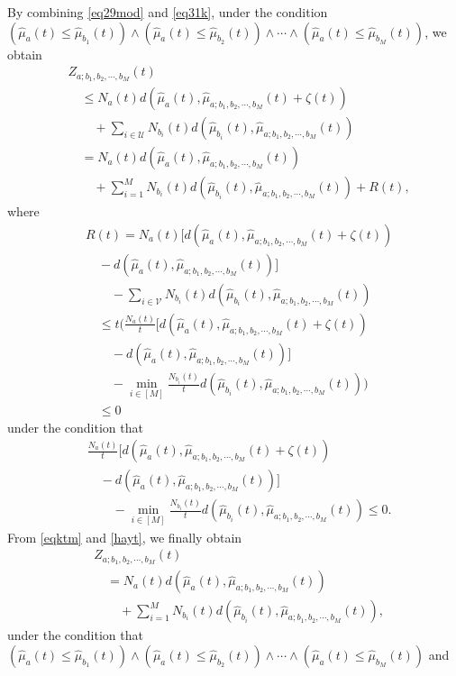 \documentclass[final]{IEEEtran}
\newcommand{\nn}{\nonumber}
\newcommand{\calU}{\mathcal{U}}
\newcommand{\calV}{\mathcal{V}}
\begin{document}
By combining \eqref{eq29mod} and \eqref{eq31k}, under the condition $(\hat{\mu}_a(t)\leq \hat{\mu}_{b_1}(t))\wedge (\hat{\mu}_a(t)\leq \hat{\mu}_{b_2}(t))\wedge \cdots \wedge (\hat{\mu}_a(t)\leq \hat{\mu}_{b_M}(t))$, we obtain
\begin{align}
&Z_{a;b_1,b_2,\cdots,b_M}(t) \nn\\
&\quad \leq N_a(t)d(\hat{\mu}_a(t),\hat{\mu}_{a;b_1,b_2,\cdots,b_M}(t)+\zeta(t))\nn\\
&\qquad +\sum_{i\in \calU} N_{b_i}(t) d(\hat{\mu}_{b_i}(t),\hat{\mu}_{a;b_1,b_2,\cdots,b_M}(t))\\
&\quad = N_a(t)d(\hat{\mu}_a(t),\hat{\mu}_{a;b_1,b_2,\cdots,b_M}(t))\nn\\
&\qquad +\sum_{i=1}^M N_{b_i}(t) d(\hat{\mu}_{b_i}(t),\hat{\mu}_{a;b_1,b_2,\cdots,b_M}(t))+ R(t),
\end{align}
where
\begin{align}
&R(t)=N_a(t)\big[d(\hat{\mu}_a(t),\hat{\mu}_{a;b_1,b_2,\cdots,b_M}(t)+\zeta(t))\nn\\
&\quad - d(\hat{\mu}_a(t),\hat{\mu}_{a;b_1,b_2,\cdots,b_M}(t))\big]\nn\\
&\qquad -\sum_{i \in \calV}  N_{b_i}(t) d(\hat{\mu}_{b_i}(t),\hat{\mu}_{a;b_1,b_2,\cdots,b_M}(t))\\
&\quad \leq t\bigg(\frac{N_a(t)}{t} \big[d(\hat{\mu}_a(t),\hat{\mu}_{a;b_1,b_2,\cdots,b_M}(t)+\zeta(t))\nn\\
&\qquad - d(\hat{\mu}_a(t),\hat{\mu}_{a;b_1,b_2,\cdots,b_M}(t))\big]\nn\\
&\qquad  -\min_{i \in [M]} \frac{N_{b_i}(t)}{t} d(\hat{\mu}_{b_i}(t),\hat{\mu}_{a;b_1,b_2,\cdots,b_M}(t))\bigg)\\
&\quad  \leq 0 \label{hayt}
\end{align} under the condition that
\begin{align}
&\frac{N_a(t)}{t} \big[d(\hat{\mu}_a(t),\hat{\mu}_{a;b_1,b_2,\cdots,b_M}(t)+\zeta(t))\nn\\
&\quad - d(\hat{\mu}_a(t),\hat{\mu}_{a;b_1,b_2,\cdots,b_M}(t))\big]\nn\\
&\qquad  -\min_{i \in [M]} \frac{N_{b_i}(t)}{t} d(\hat{\mu}_{b_i}(t),\hat{\mu}_{a;b_1,b_2,\cdots,b_M}(t))\leq 0. 
\end{align}
From \eqref{eqktm} and \eqref{hayt}, we finally obtain
\begin{align}
&Z_{a;b_1,b_2,\cdots,b_M}(t)\nn\\
&\quad =N_a(t)d(\hat{\mu}_a(t),\hat{\mu}_{a;b_1,b_2,\cdots,b_M}(t))\nn\\
&\qquad +\sum_{i=1}^M N_{b_i}(t) d(\hat{\mu}_{b_i}(t),\hat{\mu}_{a;b_1,b_2,\cdots,b_M}(t)) \label{eqktm2},
\end{align} under the condition that $(\hat{\mu}_a(t)\leq \hat{\mu}_{b_1}(t))\wedge (\hat{\mu}_a(t)\leq \hat{\mu}_{b_2}(t))\wedge \cdots \wedge (\hat{\mu}_a(t)\leq \hat{\mu}_{b_M}(t))$ and
\end{document}
